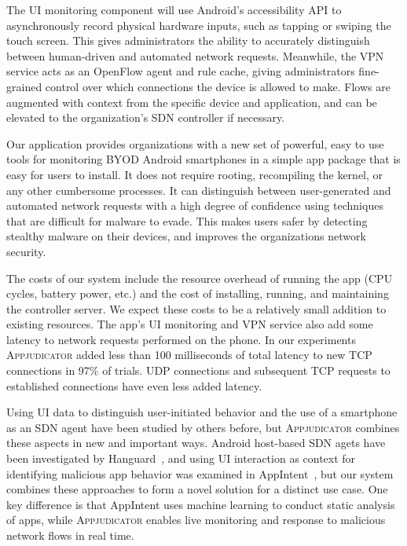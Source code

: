 The UI monitoring component will use Android's accessibility API to
asynchronously record physical hardware inputs, such as tapping or swiping the
touch screen. This gives administrators the ability to accurately distinguish
between human-driven and automated network requests.  Meanwhile, the VPN service
acts as an OpenFlow agent and rule cache, giving administrators fine-grained
control over which connections the device is allowed to make. Flows are
augmented with context from the specific device and application, and can be
elevated to the organization's SDN controller if necessary.


Our application provides organizations with a new set of powerful, easy to use
tools for monitoring BYOD Android smartphones in a simple app package that is
easy for users to install. It does not require rooting, recompiling the kernel,
or any other cumbersome processes. It can distinguish between user-generated and
automated network requests with a high degree of confidence using techniques
that are difficult for malware to evade. This makes users safer by detecting
stealthy malware on their devices, and improves the organizations network
security.

The costs of our system include the resource overhead of running the app (CPU
cycles, battery power, etc.) and the cost of installing, running, and
maintaining the controller server. We expect these costs to be a relatively
small addition to existing resources. The app's UI monitoring and VPN service
also add some latency to network requests performed on the phone. In our
experiments \textsc{Appjudicator} added less than 100 milliseconds of total
latency to new TCP connections in 97\% of trials. UDP connections and subsequent
TCP requests to established connections have even less added latency.



Using UI data to distinguish user-initiated behavior and the use of a smartphone
as an SDN agent have been studied by others before, but \textsc{Appjudicator}
combines these aspects in new and important ways. Android host-based SDN agets
have been investigated by Hanguard~\cite{demetriou2017}, and using UI
interaction as context for identifying malicious app behavior was examined in
AppIntent~\cite{yang2013}, but our system combines these approaches to form a
novel solution for a distinct use case. One key difference is that AppIntent
uses machine learning to conduct static analysis of apps, while
\textsc{Appjudicator} enables live monitoring and response to malicious network
flows in real time.

